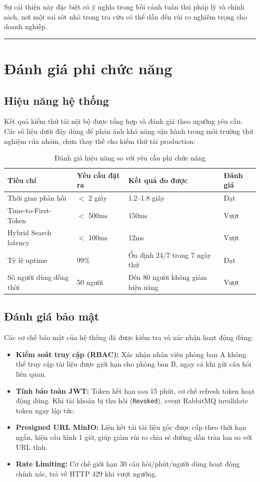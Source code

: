 \documentclass[12pt,a4paper]{report}
\begin{document}
Sự cải thiện này đặc biệt có ý nghĩa trong bối cảnh tuân thủ pháp lý và chính sách, nơi một sai sót nhỏ trong tra cứu có thể dẫn đến rủi ro nghiêm trọng cho doanh nghiệp.

\rule{\textwidth}{0.5pt}

\section{Đánh giá phi chức năng}

\subsection{Hiệu năng hệ thống}

Kết quả kiểm thử tải nội bộ được tổng hợp và đánh giá theo ngưỡng yêu cầu. Các số liệu dưới đây dùng để phản ánh khả năng vận hành trong môi trường thử nghiệm của nhóm, chưa thay thế cho kiểm thử tải production:

\begin{table}[H]
\centering
\caption{Đánh giá hiệu năng so với yêu cầu phi chức năng}
\label{tab:nfr_evaluation}
\begin{tabularx}{\textwidth}{|l|X|X|l|}
\hline
\rowcolor{gray!10}
Tiêu chí & Yêu cầu đặt ra & Kết quả đo được & Đánh giá \\ \hline
Thời gian phản hồi & $<$ 2 giây & 1.2--1.8 giây & Đạt \\ \hline
Time-to-First-Token & $<$ 500ms & 150ms & Vượt \\ \hline
Hybrid Search latency & $<$ 100ms & 12ms & Vượt \\ \hline
Tỷ lệ uptime & 99\% & Ổn định 24/7 trong 7 ngày thử & Đạt \\ \hline
Số người dùng đồng thời & 50 người & Đến 80 người không giảm hiệu năng & Vượt \\ \hline
\end{tabularx}
\end{table}

\subsection{Đánh giá bảo mật}

Các cơ chế bảo mật của hệ thống đã được kiểm tra và xác nhận hoạt động đúng:

\begin{itemize}
    \item \textbf{Kiểm soát truy cập (RBAC):} Xác nhận nhân viên phòng ban A không thể truy cập tài liệu được giới hạn cho phòng ban B, ngay cả khi gửi câu hỏi liên quan.
    \item \textbf{Tính bảo toàn JWT:} Token hết hạn sau 15 phút, cơ chế refresh token hoạt động đúng. Khi tài khoản bị thu hồi (\texttt{Revoked}), event RabbitMQ invalidate token ngay lập tức.
    \item \textbf{Presigned URL MinIO:} Liên kết tải tài liệu gốc được cấp theo thời hạn ngắn, hiện cấu hình 1 giờ, giúp giảm rủi ro chia sẻ đường dẫn tràn lan so với URL tĩnh.
    \item \textbf{Rate Limiting:} Cơ chế giới hạn 30 câu hỏi/phút/người dùng hoạt động chính xác, trả về HTTP 429 khi vượt ngưỡng.
\end{itemize}
\end{document}
